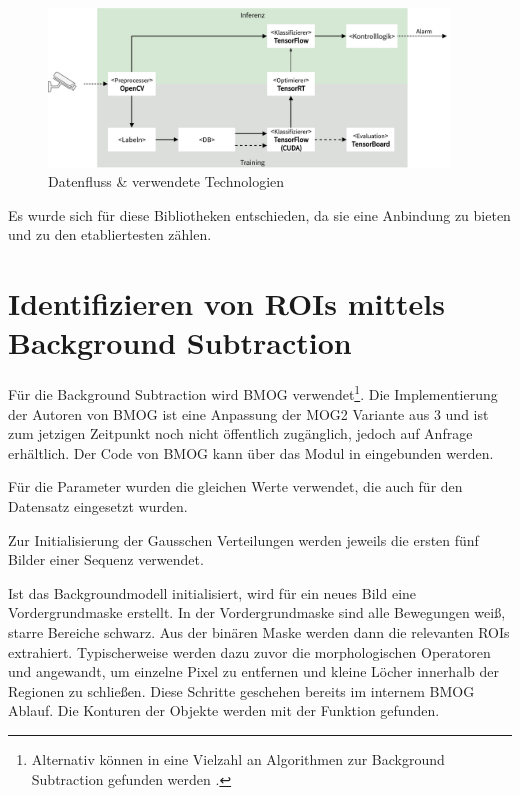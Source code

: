\begin{figure}[ht]
    \begin{small}
        \begin{center}
            \includegraphics[width=0.95\textwidth]{figures/architecture/technologie.png}
        \end{center}
        \caption{Datenfluss \& verwendete Technologien}
        \label{ch5:fig:technologies}
    \end{small}
\end{figure}

Es wurde sich für diese Bibliotheken entschieden, da sie eine Anbindung zu  bieten und zu den etabliertesten zählen.

\section{Identifizieren von ROIs mittels Background Subtraction} \label{ch5:rois}
Für die Background Subtraction wird BMOG verwendet\footnote{Alternativ können in  eine Vielzahl an Algorithmen zur Background Subtraction gefunden werden \cite{sobral_bgslibrary:_2013}.}.
Die Implementierung der Autoren von BMOG ist eine Anpassung der MOG2 Variante aus  3 und ist zum jetzigen Zeitpunkt noch nicht öffentlich zugänglich, jedoch auf Anfrage erhältlich.
Der Code von BMOG kann über das Modul  in  eingebunden werden.

Für die Parameter wurden die gleichen Werte verwendet, die auch für den  Datensatz eingesetzt wurden.

Zur Initialisierung der Gausschen Verteilungen werden jeweils die ersten fünf Bilder einer Sequenz verwendet.

Ist das Backgroundmodell initialisiert, wird für ein neues Bild eine Vordergrundmaske erstellt.
In der Vordergrundmaske sind alle Bewegungen weiß, starre Bereiche schwarz.
Aus der binären Maske werden dann die relevanten \acp{ROI} extrahiert.
Typischerweise werden dazu zuvor die morphologischen Operatoren  und  angewandt, um einzelne Pixel zu entfernen und kleine Löcher innerhalb der Regionen zu schließen.
Diese Schritte geschehen bereits im internem BMOG Ablauf.
Die Konturen der Objekte werden mit der  Funktion  gefunden.

